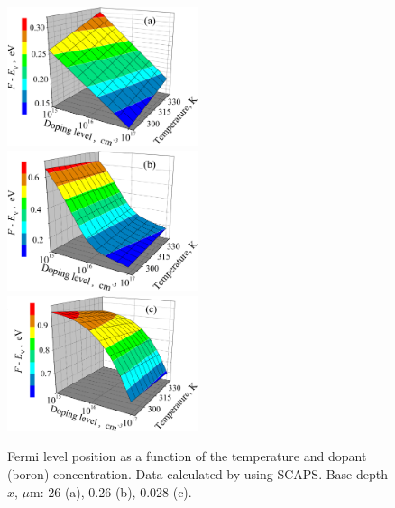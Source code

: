 \documentclass [sort&compress] {elsarticle}
\begin{document}
\begin{figure}[!h]
\includegraphics[width=0.5\textwidth]{FigS2a}%
\includegraphics[width=0.5\textwidth]{FigS2b}
\includegraphics[width=0.5\textwidth]{FigS2c}
\caption{\label{figS2}
Fermi level position as a function of the temperature and dopant (boron) concentration.
Data calculated by using SCAPS.
Base depth $x$, $\mu$m: 26 (a), 0.26 (b), 0.028 (c).
}%
\end{figure}
\end{document}
